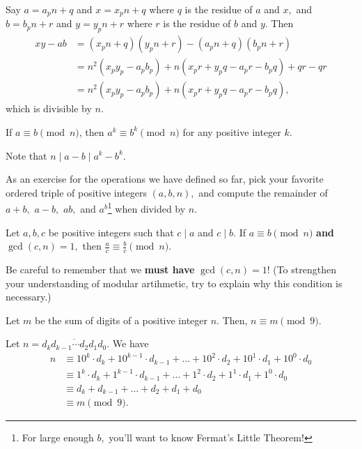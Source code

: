 \documentclass[mast]{lucky}
\begin{document}
\begin{pro}
Say $a=a_pn+q$ and $x=x_pn+q$ where $q$ is the residue of $a$ and $x,$ and $b=b_pn+r$ and $y=y_pn+r$ where $r$ is the residue of $b$ and $y.$ Then
\begin{align*}
xy-ab&=(x_pn+q)(y_pn+r)-(a_pn+q)(b_pn+r)\\
&=n^2(x_py_p-a_pb_p)+n(x_pr+y_pq-a_pr-b_pq)+qr-qr\\
&=n^2(x_py_p-a_pb_p)+n(x_pr+y_pq-a_pr-b_pq),
\end{align*}
which is divisible by $n.$
\end{pro}

\begin{fact}[Exponentiation]
If $a \equiv b\pmod{n}$, then $a^k \equiv b^k \pmod{n}$ for any positive integer $k$.
\end{fact}

\begin{pro}
Note that $n\mid a-b\mid a^k-b^k.$
\end{pro}

As an exercise for the operations we have defined so far, pick your favorite ordered triple of positive integers $(a,b,n),$ and compute the remainder of $a+b,$ $a-b,$ $ab,$ and $a^b$\footnote{For large enough $b,$ you'll want to know Fermat's Little Theorem!} when divided by $n.$

\begin{fact}[Division]
Let $a,b,c$ be positive integers such that $c\mid a$ and $c\mid b.$ If $a\equiv b\pmod{n}$ \textbf{and} $\gcd(c,n)=1,$ then $\frac{a}{c}\equiv\frac{b}{c}\pmod{n}.$
\end{fact}

Be careful to remember that we \textbf{must have} $\gcd(c,n)=1$! (To strengthen your understanding of modular artihmetic, try to explain why this condition is necessary.)

\begin{fact}
Let $m$ be the sum of digits of a positive integer $n$. Then, $n\equiv m\pmod{9}$.
\end{fact}

\begin{pro}
Let $n = \overline{d_k d_{k - 1} \cdots d_2 d_1 d_0}$. We have 
\begin{align*}
n &\equiv 10^k \cdot d_k + 10^{k-1} \cdot d_{k-1} + \dots + 10^2 \cdot d_2+10^1\cdot d_1+10^0\cdot d_0 \\
&\equiv 1^k \cdot d_k + 1^{k-1} \cdot d_{k-1} + \dots + 1^2 \cdot d_2+1^1\cdot d_1+1^0\cdot d_0 \\
&\equiv d_k + d_{k-1} + \dots + d_2+d_1+d_0 \\
&\equiv m
\pmod{9}.
\end{align*}
\end{pro}
\end{document}
